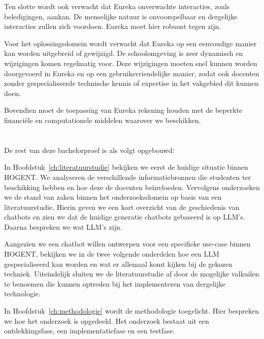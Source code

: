 Ten slotte wordt ook verwacht dat Eureka onverwachte interacties, zoals beledigingen, aankan. De menselijke natuur is onvoorspelbaar en dergelijke interacties zullen zich voordoen. Eureka moet hier robuust tegen zijn.

Voor het oplossingsdomein wordt verwacht dat Eureka op een eenvoudige manier kan worden uitgebreid of gewijzigd. De schoolomgeving is zeer dynamisch en wijzigingen komen regelmatig voor. Deze wijzigingen moeten snel kunnen worden doorgevoerd in Eureka en op een gebruiksvriendelijke manier, zodat ook docenten zonder gespecialiseerde technische kennis of expertise in het vakgebied dit kunnen doen.

Bovendien moet de toepassing van Eureka rekening houden met de beperkte financiële en computationele middelen waarover we beschikken.

\section{}%
\label{sec:opzet-bachelorproef}


De rest van deze bachelorproef is als volgt opgebouwd:

In Hoofdstuk~\ref{ch:literatuurstudie} bekijken we eerst de huidige situatie binnen HOGENT. We analyseren de verschillende informatiebronnen die studenten ter beschikking hebben en hoe deze de docenten beïnvloeden. Vervolgens onderzoeken we de stand van zaken binnen het onderzoeksdomein op basis van een literatuurstudie. Hierin geven we een kort overzicht van de geschiedenis van chatbots en zien we dat de huidige generatie chatbots gebaseerd is op \acrshort{LLM}'s. Daarna bespreken we wat \acrshort{LLM}'s zijn.

Aangezien we een chatbot willen ontwerpen voor een specifieke use-case binnen HOGENT, bekijken we in de twee volgende onderdelen hoe een \acrshort{LLM} gespecialiseerd kan worden en wat er allemaal komt kijken bij de gekozen techniek. Uiteindelijk sluiten we de literatuurstudie af door de mogelijke valkuilen te benoemen die kunnen optreden bij het implementeren van dergelijke technologie.

In Hoofdstuk~\ref{ch:methodologie} wordt de methodologie toegelicht. Hier bespreken we hoe het onderzoek is opgedeeld. Het onderzoek bestaat uit een ontdekkingsfase, een implementatiefase en een testfase.

